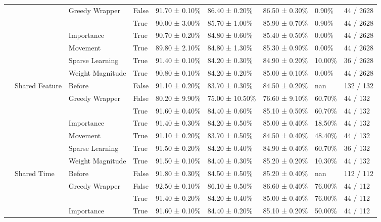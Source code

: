 \begin{tabular}{lllllllll}
\cline{3-9}
 &  & \multirow[t]{2}{*}{Greedy Wrapper} & False & 91.70 ± 0.10\% & 86.40 ± 0.20\% & 86.50 ± 0.30\% & 0.90\% & 44 / 2628 \\
 &  &  & True & 90.00 ± 3.00\% & 85.70 ± 1.00\% & 85.90 ± 0.70\% & 0.90\% & 44 / 2628 \\
\cline{3-9}
 &  & Importance & True & 90.70 ± 0.20\% & 84.80 ± 0.60\% & 85.40 ± 0.50\% & 0.00\% & 44 / 2628 \\
\cline{3-9}
 &  & Movement & True & 89.80 ± 2.10\% & 84.80 ± 1.30\% & 85.30 ± 0.90\% & 0.00\% & 44 / 2628 \\
\cline{3-9}
 &  & Sparse Learning & True & 91.40 ± 0.10\% & 84.20 ± 0.30\% & 84.90 ± 0.20\% & 10.00\% & 36 / 2628 \\
\cline{3-9}
 &  & Weight Magnitude & True & 90.80 ± 0.10\% & 84.20 ± 0.20\% & 85.00 ± 0.10\% & 0.00\% & 44 / 2628 \\
\cline{2-9} \cline{3-9}
 & \multirow[t]{7}{*}{Shared Feature} & Before & False & 91.10 ± 0.20\% & 83.70 ± 0.30\% & 84.50 ± 0.20\% & nan & 132 / 132 \\
\cline{3-9}
 &  & \multirow[t]{2}{*}{Greedy Wrapper} & False & 80.20 ± 9.90\% & 75.00 ± 10.50\% & 76.60 ± 9.10\% & 60.70\% & 44 / 132 \\
 &  &  & True & 91.60 ± 0.40\% & 84.40 ± 0.60\% & 85.10 ± 0.50\% & 60.70\% & 44 / 132 \\
\cline{3-9}
 &  & Importance & True & 91.40 ± 0.30\% & 84.20 ± 0.50\% & 85.00 ± 0.40\% & 18.50\% & 44 / 132 \\
\cline{3-9}
 &  & Movement & True & 91.10 ± 0.20\% & 83.70 ± 0.50\% & 84.50 ± 0.40\% & 48.40\% & 44 / 132 \\
\cline{3-9}
 &  & Sparse Learning & True & 91.50 ± 0.20\% & 84.20 ± 0.40\% & 84.90 ± 0.40\% & 60.70\% & 36 / 132 \\
\cline{3-9}
 &  & Weight Magnitude & True & 91.50 ± 0.10\% & 84.40 ± 0.30\% & 85.20 ± 0.20\% & 10.30\% & 44 / 132 \\
\cline{2-9} \cline{3-9}
 & \multirow[t]{7}{*}{Shared Time} & Before & False & 91.80 ± 0.30\% & 84.50 ± 0.50\% & 85.20 ± 0.40\% & nan & 112 / 112 \\
\cline{3-9}
 &  & \multirow[t]{2}{*}{Greedy Wrapper} & False & 92.50 ± 0.10\% & 86.10 ± 0.50\% & 86.60 ± 0.40\% & 76.00\% & 44 / 112 \\
 &  &  & True & 91.40 ± 0.20\% & 84.20 ± 0.40\% & 85.00 ± 0.40\% & 76.00\% & 44 / 112 \\
\cline{3-9}
 &  & Importance & True & 91.60 ± 0.10\% & 84.40 ± 0.20\% & 85.10 ± 0.20\% & 50.00\% & 44 / 112 \\

\end{tabular}
